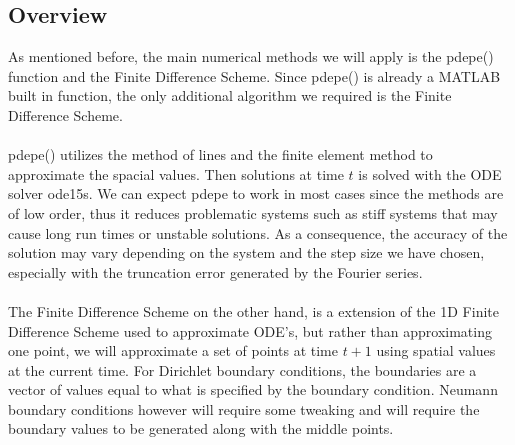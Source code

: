 \documentclass{article}
\begin{document}
\subsection{Overview}
As mentioned before, the main numerical methods we will apply is the pdepe() function and the Finite Difference Scheme. Since pdepe() is already a MATLAB built in function, the only additional algorithm we required is the Finite Difference Scheme.
\\
\\
pdepe() utilizes the method of lines and the finite element method to approximate the spacial values. Then solutions at time $t$ is solved with the ODE solver ode15s. We can expect pdepe to work in most cases since the methods are of low order, thus it reduces problematic systems such as stiff systems that may cause long run times or unstable solutions. As a consequence, the accuracy of the solution may vary depending on the system and the step size we have chosen, especially with the truncation error generated by the Fourier series.
\\
\\
The Finite Difference Scheme on the other hand, is a extension of the 1D Finite Difference Scheme used to approximate ODE's, but rather than approximating one point, we will approximate a set of points at time $t+1$ using spatial values at the current time. For Dirichlet boundary conditions, the boundaries are a vector of values equal to what is specified by the boundary condition. Neumann boundary conditions however will require some tweaking and will require the boundary values to be generated along with the middle points. 
\end{document}
